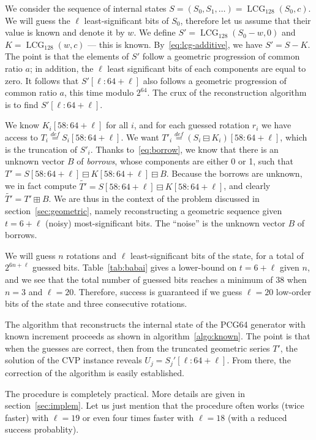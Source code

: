 \documentclass[journal=tosc,final]{iacrtrans}
\DeclareMathOperator{\LCG}{LCG}
\begin{document}
We consider the sequence of internal states
$S = (S_0, S_1, \dots) = \LCG_{128}(S_0, c)$. We will guess the $\ell$
least-significant bits of $S_0$, therefore let us assume that their value is
known and denote it by $w$. We define $S' = \LCG_{128}(S_0 - w, 0)$ and
$K = \LCG_{128}(w, c)$ --- this is known. By~\eqref{eq:lcg-additive}, we have
$S' = S - K$. The point is that the elements of $S'$ follow a geometric
progression of common ratio $a$; in addition, the $\ell$ least significant bits
of each components are equal to zero. It follows that $S'[\ell:64+\ell]$ also
follows a geometric progression of common ratio $a$, this time modulo
$2^{64}$. The crux of the reconstruction algorithm is to find
$S'[\ell:64+\ell]$.

We know $K_i[58:64+\ell]$ for all $i$, and for each guessed rotation $r_i$ we
have access to $T_i \stackrel{def}{=} S_i[58:64+\ell]$.  We want
$T'_i \stackrel{def}{=} (S_i \boxminus K_i)[58:64+\ell]$, which is the
truncation of $S'_i$. Thanks to~\eqref{eq:borrow}, we know that there is an
unknown vector $B$ of \emph{borrows}, whose components are either 0 or 1, such
that $T' = S[58:64+\ell] \boxminus K[58:64+\ell] \boxminus B$. Because the
borrows are unknown, we in fact compute
$\widetilde{T'} = S[58:64+\ell] \boxminus K[58:64+\ell]$, and clearly
$\widetilde{T'} = T' \boxplus B$. We are thus in the context of the problem
discussed in section~\ref{sec:geometric}, namely reconstructing a geometric
sequence given $t = 6+\ell$ (noisy) most-significant bits. The ``noise'' is the
unknown vector $B$ of borrows. %

We will guess $n$ rotations and $\ell$ least-significant bits of the state, for
a total of $2^{6n + \ell}$ guessed bits. Table~\ref{tab:babai} gives a
lower-bound on $t=6+\ell$ given $n$, and we see that the total number of guessed
bits reaches a minimum of $38$ when $n=3$ and $\ell=20$. Therefore, success is
guaranteed if we guess $\ell = 20$ low-order bits of the state and three
consecutive rotations.

The algorithm that reconstructs the internal state of the \textsf{PCG64}
generator with known increment proceeds as shown in
algorithm~\ref{algo:known}. The point is that when the guesses are correct, then
from the truncated geometric series $T'$, the solution of the CVP instance
reveals $U_j = S_j'[\ell:64+\ell]$. From there, the correction of the algorithm
is easily established.

The procedure is completely practical. More details are given in
section~\ref{sec:implem}. Let us just mention that the procedure often works
(twice faster) with $\ell=19$ or even four times faster with $\ell = 18$ (with a
reduced success probablity).
\end{document}
